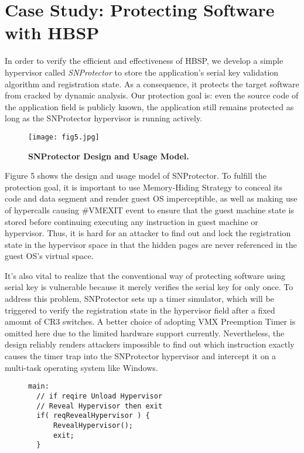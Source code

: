 \documentclass[conference]{IEEEtran}
\begin{document}
{\section{Case Study: Protecting Software with HBSP}
In order to verify the efficient and effectiveness of HBSP, we
develop a simple hypervisor called \emph{SNProtector} to store the
application's serial key validation algorithm and registration
state. As a consequence, it protects the target software from
cracked by dynamic analysis. Our protection goal is: even the
source code of the application field is publicly known, the
application still remains protected as long as the SNProtector
hypervisor is running actively.

\begin{figure}[!htb]
\begin{center}
\texttt{[image: fig5.jpg]}
\end{center}
\caption{{\bf SNProtector Design and Usage Model.}} \label{Figure
5.}
\end{figure}

Figure 5 shows the design and usage model of SNProtector. To
fulfill the protection goal, it is important to use Memory-Hiding
Strategy to conceal its code and data segment and render guest OS
imperceptible, as well as making use of hypercalls causing
\#VMEXIT event to ensure that the guest machine state is stored
before continuing executing any instruction in guest machine or
hypervisor. Thus, it is hard for an attacker to find out and lock
the registration state in the hypervisor space in that the hidden
pages are never referenced in the guest OS's virtual space.

It's also vital to realize that the conventional way of protecting
software using serial key is vulnerable because it merely verifies
the serial key for only once. To address this problem, SNProtector
sets up a timer simulator, which will be triggered to verify the
registration state in the hypervisor field after a fixed amount of
CR3 switches. A better choice of adopting VMX Preemption Timer is
omitted here due to the limited hardware support currently.
Nevertheless, the design reliably renders attackers impossible to
find out which instruction exactly causes the timer trap into the
SNProtector hypervisor and intercept it on a multi-task operating
system like Windows.

\begin{figure}
\begin{lstlisting}
main:
  // if reqire Unload Hypervisor
  // Reveal Hypervisor then exit
  if( reqRevealHypervisor ) {
      RevealHypervisor();
      exit;
  }


\end{lstlisting}
\end{figure}}
\end{document}
